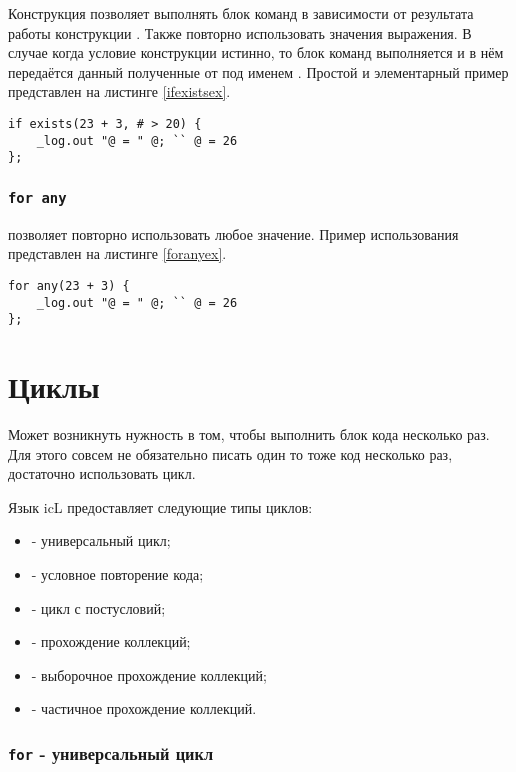 \documentclass[a4paper, 14pt]{extarticle}
\newenvironment{icItems}
	{ \begin{itemize} [noitemsep,nolistsep] }
	{ \end{itemize} }
\begin{document}
Конструкция  позволяет выполнять блок команд в зависимости от результата работы конструкции . Также повторно использовать значения выражения. В случае когда условие конструкции  истинно, то блок команд выполняется и в нём передаётся данный полученные от  под именем .
Простой и элементарный пример представлен на листинге \ref{ifexistsex}.

\begin{lstlisting}[caption=Использование if exist, label=ifexistsex]
if exists(23 + 3, # > 20) {
	_log.out "@ = " @; `` @ = 26
};
\end{lstlisting}

\subsubsection{\lstinline`for any`}

 позволяет повторно использовать любое значение. Пример использования представлен на листинге \ref{foranyex}.

\begin{lstlisting}[caption=Использование for any, label=foranyex]
for any(23 + 3) {
	_log.out "@ = " @; `` @ = 26
};
\end{lstlisting}

\newpage
\section{Циклы}

Может возникнуть нужность в том, чтобы выполнить блок кода несколько раз. Для этого совсем не обязательно писать один то тоже код несколько раз, достаточно использовать цикл.

Язык icL предоставляет следующие типы циклов:

\begin{icItems}
\item
	 - универсальный цикл;
\item
	 - условное повторение кода;
\item
	 - цикл с постусловий;
\item
	 - прохождение коллекций;
\item
	 - выборочное прохождение коллекций;
\item
	 - частичное прохождение коллекций.
\end{icItems}


\subsubsection{\lstinline`for` - универсальный цикл}
\end{document}
